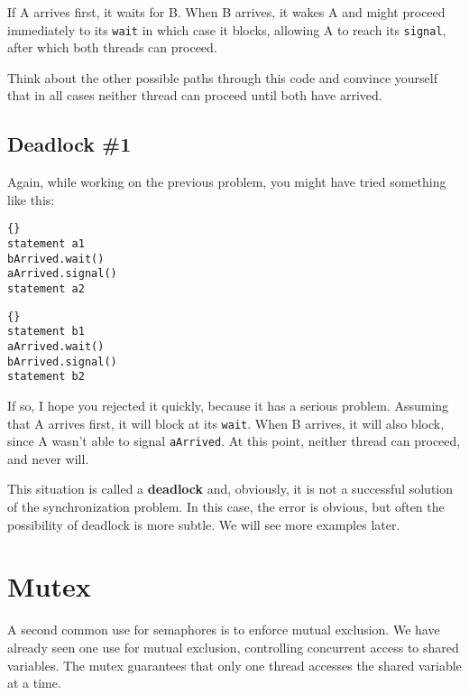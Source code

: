 \documentclass{book}
\begin{document}
If A arrives first, it waits for B.  When B arrives, it wakes
A and might proceed immediately to its {\tt wait} in which
case it blocks, allowing A to reach its {\tt signal}, after
which both threads can proceed.

Think about the other possible paths through this code and
convince yourself that in all cases neither thread can
proceed until both have arrived.

\subsection {Deadlock \#1}

Again, while working on the previous problem, you might have
tried something like this:

\begin{minipage}[t]{2in}
\begin{lstlisting}[title={Thread A}]{}
statement a1
bArrived.wait()
aArrived.signal()
statement a2
\end{lstlisting}
\end{minipage}
\hfill
\begin{minipage}[t]{2in}
\begin{lstlisting}[title={Thread B}]{}
statement b1
aArrived.wait()
bArrived.signal()
statement b2
\end{lstlisting}
\end{minipage}

If so, I hope you rejected it quickly, because it has a serious
problem.  Assuming that A arrives first, it will block at its
{\tt wait}.  When B arrives, it will also block, since A wasn't
able to signal {\tt aArrived}.  At this point, neither thread
can proceed, and never will.

This situation is called a {\bf deadlock} and, obviously, it is
not a successful solution of the synchronization problem.  In
this case, the error is obvious, but often the possibility of
deadlock is more subtle.  We will see more examples later.


\section{Mutex}

A second common use for semaphores is to enforce mutual exclusion.
We have already seen one use for mutual exclusion, controlling
concurrent access to shared variables.  The mutex guarantees
that only one thread accesses the shared variable at a time.
\end{document}
